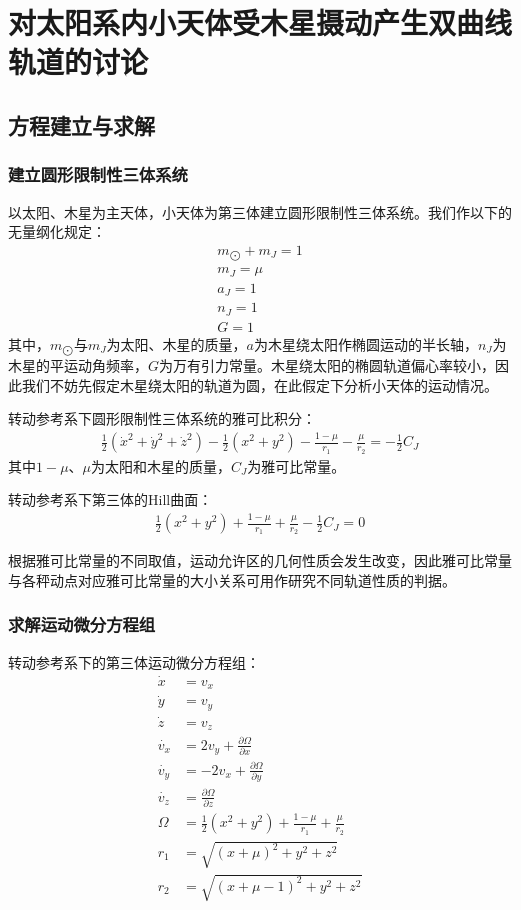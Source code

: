 \chapter{对太阳系内小天体受木星摄动产生双曲线轨道的讨论}

\section{方程建立与求解}

\subsection{建立圆形限制性三体系统}

以太阳、木星为主天体，小天体为第三体建立圆形限制性三体系统。我们作以下的无量纲化规定：
\begin{align}
    m_{\bigodot}+m_J=1
    \\m_J=\mu
    \\a_J=1
    \\n_J=1
    \\G=1
\end{align}
其中，$m_{\bigodot}$与$m_J$为太阳、木星的质量，$a$为木星绕太阳作椭圆运动的半长轴，$n_J$为木星的平运动角频率，$G$为万有引力常量。木星绕太阳的椭圆轨道偏心率较小，因此我们不妨先假定木星绕太阳的轨道为圆，在此假定下分析小天体的运动情况。

转动参考系下圆形限制性三体系统的雅可比积分：
\begin{align}
    \frac{1}{2}\left( \dot{x}^2+\dot{y}^2+\dot{z}^2\right)-\frac{1}{2}\left( x^2+y^2\right)-\frac{1-\mu}{r_1}-\frac{\mu}{r_2}=-\frac{1}{2}C_J
\end{align}
其中$1-\mu$、$\mu$为太阳和木星的质量，$C_J$为雅可比常量。

转动参考系下第三体的Hill曲面：
\begin{align}
    \frac{1}{2}\left( x^2+y^2\right)+\frac{1-\mu}{r_1}+\frac{\mu}{r_2}-\frac{1}{2}C_J=0
\end{align}

根据雅可比常量的不同取值，运动允许区的几何性质会发生改变，因此雅可比常量与各秤动点对应雅可比常量的大小关系可用作研究不同轨道性质的判据。

\subsection{求解运动微分方程组}

转动参考系下的第三体运动微分方程组：
\begin{align}
    \dot{x}&=v_x
    \\\dot{y}&=v_y
    \\\dot{z}&=v_z
    \\\dot{v_x}&=2v_y+\frac{\partial \Omega}{\partial x}
    \\\dot{v_y}&=-2v_x+\frac{\partial \Omega}{\partial y}
    \\\dot{v_z}&=\frac{\partial \Omega}{\partial z}
    \\\Omega&=\frac{1}{2}\left( x^2+y^2\right)+\frac{1-\mu}{r_1}+\frac{\mu}{r_2}
    \\r_1&=\sqrt{(x+\mu)^2+y^2+z^2}
    \\r_2&=\sqrt{(x+\mu-1)^2+y^2+z^2}
\end{align}

